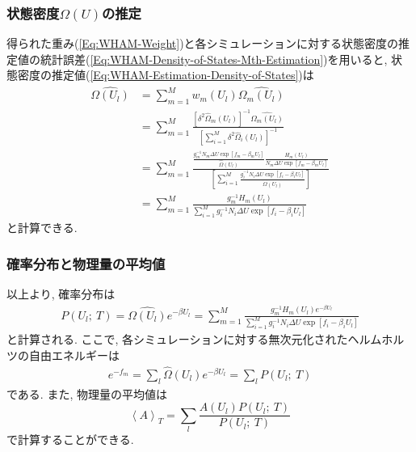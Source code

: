 \subsubsection{状態密度$\Omega(U)$の推定}
得られた重み(\ref{Eq:WHAM-Weight})と各シミュレーションに対する状態密度の推定値の統計誤差(\ref{Eq:WHAM-Density-of-States-Mth-Estimation})を用いると, 状態密度の推定値(\ref{Eq:WHAM-Estimation-Density-of-States})は
\begin{align}
    \hat{\Omega(U_{l})}
    &=
    \sum_{m=1}^{M} w_{m}(U_{l}) \hat{\Omega_{m}(U_{l})}
    \\ &=
    \sum_{m=1}^{M}
    \frac
    {
        [\delta^{2}\hat{\Omega}_{m}(U_{l})]^{-1} \hat{\Omega_{m}(U_{l})}
    }
    {
        [\sum_{i=1}^{M}\delta^{2}\hat{\Omega}_{i}(U_{l})]^{-1}
    }
    \\ &=
    \sum_{m=1}^{M}
    \frac
    {
        \frac{g_{m}^{-1}N_{m}\Delta U \exp[f_{m}-\beta_{m}U_{l}]}{\hat{\Omega}(U_{l})}
        \frac{H_{m}(U_{l})}{N_{m}\Delta U \exp[f_{m}-\beta_{m}U_{l}]}
    }
    {
        \left[
            \sum_{i=1}^{M}
            \frac{g_{i}^{-1} N_{i} \Delta U \exp[f_{i}-\beta_{i}U_{l}]}{\hat{\Omega}(U_{l})}
        \right]
    }
    \\ &=
    \sum_{m=1}^{M}
    \frac{g_{m}^{-1} H_{m}(U_{l})}{\sum_{i=1}^{M} g_{i}^{-1} N_{i} \Delta U \exp[f_{i}-\beta_{i}U_{l}]}
\end{align}
と計算できる. 

\subsubsection{確率分布と物理量の平均値}
以上より, 確率分布は
\begin{align}
    P(U_{l};~ T) =
    \hat{\Omega(U_{l})} e^{-\beta U_{l}}
    =
    \sum_{m=1}^{M}
    \frac{g_{m}^{-1} H_{m}(U_{l}) e^{-\beta U_{l}}}{\sum_{i=1}^{M} g_{i}^{-1} N_{i} \Delta U \exp[f_{i}-\beta_{i}U_{l}]}
\end{align}
と計算される. ここで, 各シミュレーションに対する無次元化されたヘルムホルツの自由エネルギーは
\begin{align}
    e^{-f_{m}} =
    \sum_{l} \hat{\Omega}(U_{l}) e^{-\beta U_{l}} =
    \sum_{l} P(U_{l};~ T)
\end{align}
である. また, 物理量の平均値は
\begin{equation}
    \left\langle A \right\rangle_{T} =
    \sum_{l}
    \frac{A(U_{l}) P(U_{l};~ T)}{P(U_{l};~ T)}
\end{equation}
で計算することができる. 

